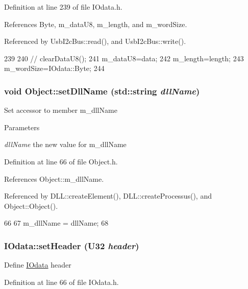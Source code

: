 Definition at line 239 of file IOdata.h.

References Byte, m\_\-dataU8, m\_\-length, and m\_\-wordSize.

Referenced by UsbI2cBus::read(), and UsbI2cBus::write().


\begin{DoxyCode}
239                                       {
240 //    clearDataU8();
241     m_dataU8=data;
242     m_length=length;
243     m_wordSize=IOdata::Byte;
244   }
\end{DoxyCode}
\hypertarget{classObject_a870c5af919958c2136623b2d7816d123}{
\subsubsection[{setDllName}]{\setlength{\rightskip}{0pt plus 5cm}void Object::setDllName (std::string {\em dllName})}}
\label{classObject_a870c5af919958c2136623b2d7816d123}
Set accessor to member m\_\-dllName 
\begin{DoxyParams}{Parameters}
\item[{\em dllName}]the new value for m\_\-dllName \end{DoxyParams}


Definition at line 66 of file Object.h.

References Object::m\_\-dllName.

Referenced by DLL::createElement(), DLL::createProcessus(), and Object::Object().


\begin{DoxyCode}
66                                       {
67     m_dllName = dllName;
68   }
\end{DoxyCode}
\hypertarget{classIOdata_a9a850f401542d416adf061e30f7dfdd5}{
\subsubsection[{setHeader}]{ IOdata::setHeader ({\bf U32} {\em header})}}
\label{classIOdata_a9a850f401542d416adf061e30f7dfdd5}
Define \hyperlink{classIOdata}{IOdata} header 

Definition at line 66 of file IOdata.h.

